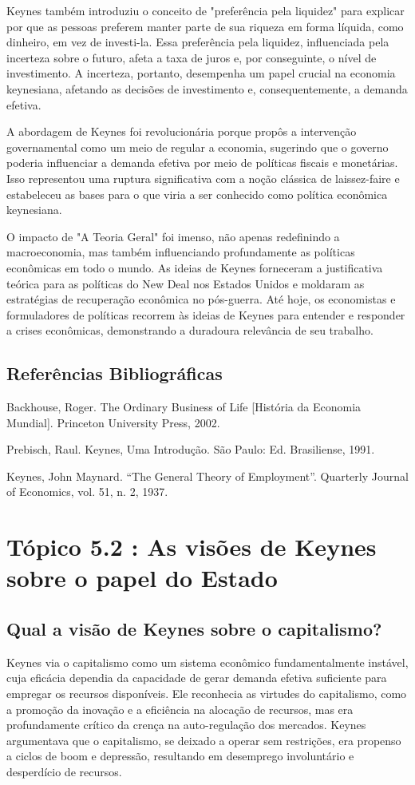 \documentclass[12pt]{article}
\begin{document}
Keynes também introduziu o conceito de "preferência pela liquidez" para explicar por que as pessoas preferem manter parte de sua riqueza em forma líquida, como dinheiro, em vez de investi-la. Essa preferência pela liquidez, influenciada pela incerteza sobre o futuro, afeta a taxa de juros e, por conseguinte, o nível de investimento. A incerteza, portanto, desempenha um papel crucial na economia keynesiana, afetando as decisões de investimento e, consequentemente, a demanda efetiva.

A abordagem de Keynes foi revolucionária porque propôs a intervenção governamental como um meio de regular a economia, sugerindo que o governo poderia influenciar a demanda efetiva por meio de políticas fiscais e monetárias. Isso representou uma ruptura significativa com a noção clássica de laissez-faire e estabeleceu as bases para o que viria a ser conhecido como política econômica keynesiana.

O impacto de "A Teoria Geral" foi imenso, não apenas redefinindo a macroeconomia, mas também influenciando profundamente as políticas econômicas em todo o mundo. As ideias de Keynes forneceram a justificativa teórica para as políticas do New Deal nos Estados Unidos e moldaram as estratégias de recuperação econômica no pós-guerra. Até hoje, os economistas e formuladores de políticas recorrem às ideias de Keynes para entender e responder a crises econômicas, demonstrando a duradoura relevância de seu trabalho.

\subsection{\textbf{Referências Bibliográficas}}
Backhouse, Roger. The Ordinary Business of Life [História da Economia Mundial]. Princeton
University Press, 2002.

Prebisch, Raul. Keynes, Uma Introdução. São Paulo: Ed. Brasiliense, 1991.

Keynes, John Maynard. “The General Theory of Employment”. Quarterly Journal of Economics,
vol. 51, n. 2, 1937.

\section{\textbf{Tópico 5.2 : As visões de Keynes sobre o papel do Estado}}
\subsection{\textbf{Qual a visão de Keynes sobre o capitalismo?}}
Keynes via o capitalismo como um sistema econômico fundamentalmente instável, cuja eficácia dependia da capacidade de gerar demanda efetiva suficiente para empregar os recursos disponíveis. Ele reconhecia as virtudes do capitalismo, como a promoção da inovação e a eficiência na alocação de recursos, mas era profundamente crítico da crença na auto-regulação dos mercados. Keynes argumentava que o capitalismo, se deixado a operar sem restrições, era propenso a ciclos de boom e depressão, resultando em desemprego involuntário e desperdício de recursos.
\end{document}
